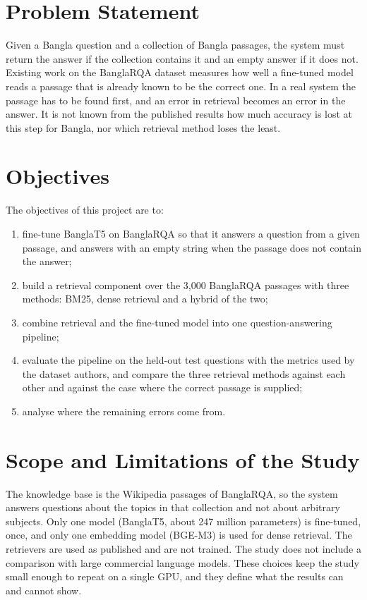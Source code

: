 \section{Problem Statement}

Given a Bangla question and a collection of Bangla passages, the system must return the answer if the collection contains it and an empty answer if it does not. Existing work on the BanglaRQA dataset \cite{ekram2022banglarqa} measures how well a fine-tuned model reads a passage that is already known to be the correct one. In a real system the passage has to be found first, and an error in retrieval becomes an error in the answer. It is not known from the published results how much accuracy is lost at this step for Bangla, nor which retrieval method loses the least.

\section{Objectives}

The objectives of this project are to:
\begin{enumerate}
	\item fine-tune BanglaT5 on BanglaRQA so that it answers a question from a given passage, and answers with an empty string when the passage does not contain the answer;
	\item build a retrieval component over the 3,000 BanglaRQA passages with three methods: BM25, dense retrieval and a hybrid of the two;
	\item combine retrieval and the fine-tuned model into one question-answering pipeline;
	\item evaluate the pipeline on the held-out test questions with the metrics used by the dataset authors, and compare the three retrieval methods against each other and against the case where the correct passage is supplied;
	\item analyse where the remaining errors come from.
\end{enumerate}

\section{Scope and Limitations of the Study}

The knowledge base is the Wikipedia passages of BanglaRQA, so the system answers questions about the topics in that collection and not about arbitrary subjects. Only one model (BanglaT5, about 247 million parameters) is fine-tuned, once, and only one embedding model (BGE-M3) is used for dense retrieval. The retrievers are used as published and are not trained. The study does not include a comparison with large commercial language models. These choices keep the study small enough to repeat on a single GPU, and they define what the results can and cannot show.

